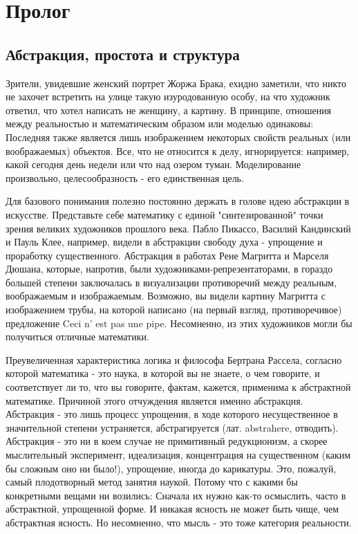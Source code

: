 \section{Пролог}
\subsection{Абстракция, простота и структура}
Зрители, увидевшие женский портрет Жоржа Брака, ехидно заметили, что никто не захочет встретить на улице такую изуродованную особу, на что художник ответил, что хотел написать не женщину, а картину.
В принципе, отношения между реальностью и математическим образом или моделью одинаковы: Последняя также является лишь изображением некоторых свойств реальных (или воображаемых) объектов. Все, что не относится к делу, игнорируется: например, какой сегодня день недели или что над озером туман. Моделирование произвольно, целесообразность - его единственная цель.

Для базового понимания полезно постоянно держать в голове идею абстракции в искусстве. Представьте себе математику с единой "синтезированной" точки зрения великих художников прошлого века. Пабло Пикассо, Василий Кандинский и Пауль Клее, например, видели в абстракции свободу духа - упрощение и проработку существенного. Абстракция в работах Рене Магритта и Марселя Дюшана, которые, напротив, были художниками-репрезентаторами, в гораздо большей степени заключалась в визуализации противоречий между реальным, воображаемым и изображаемым. Возможно, вы видели картину Магритта с изображением трубы, на которой написано (на первый взгляд, противоречивое) предложение Ceci n' est pas une pipe. Несомненно, из этих художников могли бы получиться отличные математики.

Преувеличенная характеристика логика и философа Бертрана Рассела, согласно которой математика - это наука, в которой вы не знаете, о чем говорите, и соответствует ли то, что вы говорите, фактам, кажется, применима к абстрактной математике.
Причиной этого отчуждения является именно абстракция. Абстракция - это лишь процесс упрощения, в ходе которого несущественное в значительной степени устраняется, абстрагируется (лат. abstrahere, отводить). Абстракция - это ни в коем случае не примитивный редукционизм, а скорее мыслительный эксперимент, идеализация, концентрация на существенном (каким бы сложным оно ни было!), упрощение, иногда до карикатуры. Это, пожалуй, самый плодотворный метод занятия наукой. Потому что с какими бы конкретными вещами ни возились: Сначала их нужно как-то осмыслить, часто в абстрактной, упрощенной форме. И никакая ясность не может быть чище, чем абстрактная ясность. Но несомненно, что мысль - это тоже категория реальности.

